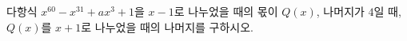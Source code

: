 다항식 $x^{60}-x^{31}+ax^3+1$을 $x-1$로 나누었을 때의 몫이 $Q(x)$, 나머지가 $4$일 때, $Q(x)$를 $x+1$로 나누었을 때의 나머지를 구하시오. 
